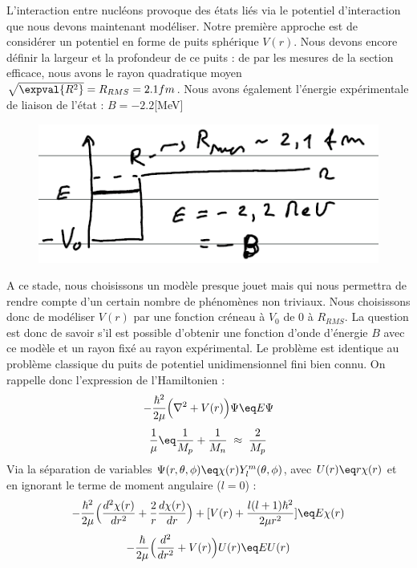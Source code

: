 L'interaction entre nucléons provoque des états liés via le potentiel d'interaction que nous devons maintenant modéliser. Notre première approche est de considérer un potentiel en forme de puits sphérique $V(r)$. Nous devons encore définir la largeur et la profondeur de ce puits : de par les mesures de la section efficace, nous avons le rayon quadratique moyen $\sqrt{\expval{R^2}} = R_{RMS} = 2.1fm$. Nous avons également l'énergie expérimentale de liaison de l'état : $B = -2.2$[MeV]
\begin{figure}[H]
    \centering
    \includegraphics[scale=0.8]{Images4/Puits.PNG}
\end{figure}
A ce stade, nous choisissons un modèle presque jouet mais qui nous permettra de rendre compte d'un certain nombre de phénomènes non triviaux. Nous choisissons donc de modéliser $V(r)$ par une fonction créneau à $V_0$ de 0 à $R_{RMS}$. La question est donc de savoir s'il est possible d'obtenir une fonction d'onde d'énergie $B$ avec ce modèle et un rayon fixé au rayon expérimental. Le problème est identique au problème classique du puits de potentiel unidimensionnel fini bien connu. On rappelle donc l'expression de l'Hamiltonien :
\begin{equation*}
    -\frac{\hbar^2}{2\mu}\Big(\nabla^2 + V(r)\Big)\Psi \eq E\Psi
\end{equation*}
\begin{equation*}
    \frac{1}{\mu} \eq \frac{1}{M_p} + \frac{1}{M_n} \; \approx \; \frac{2}{M_p}
\end{equation*}
Via la séparation de variables $\Psi(r,\theta,\phi) \eq \chi(r)Y_l^m(\theta,\phi)$, avec $U(r) \eq r\chi(r)$ et en ignorant le terme de moment angulaire ($l=0$) :
\begin{equation*}
    -\frac{\hbar^2}{2\mu}\Big(\dfrac{d^2\chi(r)}{dr^2} + \frac{2}{r}\dfrac{d\chi(r)}{dr}\Big) + [V(r) + \frac{l(l+1)\hbar^2}{2\mu r^2}]\eq E\chi(r)
\end{equation*}
\begin{equation*}
    -\frac{\hbar}{2\mu}\Big(\dfrac{d^2}{dr^2} + V(r) \Big)U(r) \eq EU(r)
\end{equation*}

